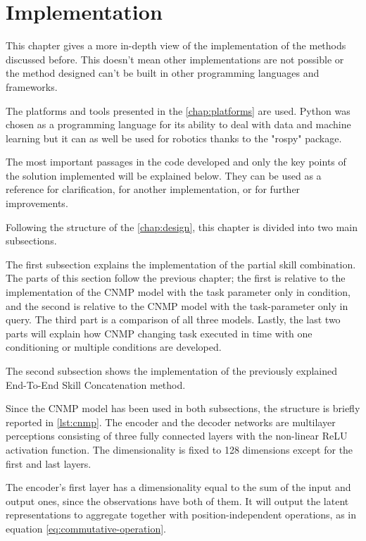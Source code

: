 \chapter{Implementation} 
\label{chap:implementation}

This chapter gives a more in-depth view of the implementation of the methods discussed before. This doesn't mean other implementations are not possible or the method designed can't be built in other programming languages and frameworks.

The platforms and tools presented in the \cref{chap:platforms} are used. Python was chosen as a programming language for its ability to deal with data and machine learning but it can as well be used for robotics thanks to the "rospy" package. 

The most important passages in the code developed and only the key points of the solution implemented will be explained below. They can be used as a reference for clarification, for another implementation, or for further improvements. 

Following the structure of the \cref{chap:design}, this chapter is divided into two main subsections. 

The first subsection explains the implementation of the partial skill combination.
The parts of this section follow the previous chapter; the first is relative to the implementation of the CNMP model with the task parameter only in condition, and the second is relative to the CNMP model with the task-parameter only in query. The third part is a comparison of all three models. Lastly, the last two parts will explain how CNMP changing task executed in time with one conditioning or multiple conditions are developed.

The second subsection shows the implementation of the previously explained End-To-End Skill Concatenation method. 

Since the CNMP model has been used in both subsections, the structure is briefly reported in \cref{lst:cnmp}. The encoder and the decoder networks are multilayer perceptions consisting of three fully connected layers with the non-linear ReLU activation function. The dimensionality is fixed to 128 dimensions except for the first and last layers. 

The encoder's first layer has a dimensionality equal to the sum of the input and output ones, since the observations have both of them. It will output the latent representations to aggregate together with position-independent operations, as in equation \ref{eq:commutative-operation}. 

